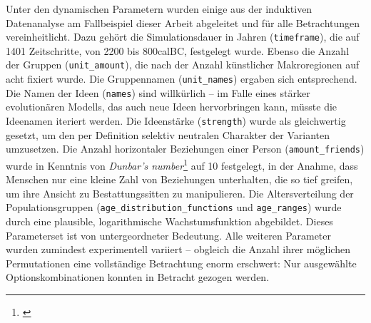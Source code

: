 \documentclass[openany,twoside,twocolumn]{book}
\let\rmarkdownfootnote\footnote%
\def\footnote{\protect\rmarkdownfootnote}
\begin{document}
Unter den dynamischen Parametern wurden einige aus der induktiven
Datenanalyse am Fallbeispiel dieser Arbeit abgeleitet und für alle
Betrachtungen vereinheitlicht. Dazu gehört die Simulationsdauer in
Jahren (\texttt{timeframe}), die auf 1401 Zeitschritte, von 2200 bis
800calBC, festgelegt wurde. Ebenso die Anzahl der Gruppen
(\texttt{unit\_amount}), die nach der Anzahl künstlicher Makroregionen
auf acht fixiert wurde. Die Gruppennamen (\texttt{unit\_names}) ergaben
sich entsprechend. Die Namen der Ideen (\texttt{names}) sind willkürlich
-- im Falle eines stärker evolutionären Modells, das auch neue Ideen
hervorbringen kann, müsste die Ideenamen iteriert werden. Die
Ideenstärke (\texttt{strength}) wurde als gleichwertig gesetzt, um den
per Definition selektiv neutralen Charakter der Varianten umzusetzen.
Die Anzahl horizontaler Beziehungen einer Person
(\texttt{amount\_friends}) wurde in Kenntnis von \emph{Dunbar's
number}\footnote{\textcite{dunbar_neocortex_1992}} auf 10 festgelegt, in
der Anahme, dass Menschen nur eine kleine Zahl von Beziehungen
unterhalten, die so tief greifen, um ihre Ansicht zu Bestattungssitten
zu manipulieren. Die Altersverteilung der Populationsgruppen
(\texttt{age\_distribution\_functions} und \texttt{age\_ranges}) wurde
durch eine plausible, logarithmische Wachstumsfunktion abgebildet.
Dieses Parameterset ist von untergeordneter Bedeutung. Alle weiteren
Parameter wurden zumindest experimentell variiert -- obgleich die Anzahl
ihrer möglichen Permutationen eine vollständige Betrachtung enorm
erschwert: Nur ausgewählte Optionskombinationen konnten in Betracht
gezogen werden.
\end{document}
